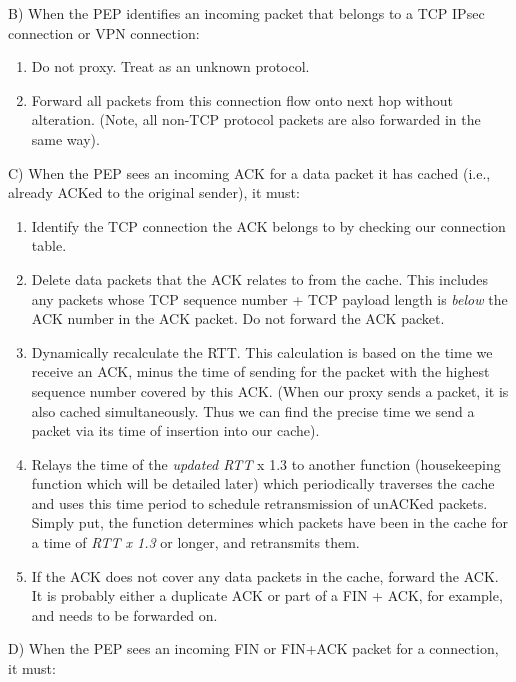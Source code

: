 \documentclass{uathesis}
\begin{document}
\noindent B) When the PEP identifies an incoming packet that belongs to a TCP IPsec connection or VPN connection:\\

\begin{enumerate}
\item Do not proxy. Treat as an unknown protocol.
\item Forward all packets from this connection flow onto next hop without alteration. (Note, all non-TCP protocol packets are also forwarded in the same way).\\
\end{enumerate}

\noindent C) When the PEP sees an incoming ACK for a data packet it has cached (i.e., already ACKed to the original sender), it must:\\

\begin{enumerate}
\item Identify the TCP connection the ACK belongs to by checking our connection table. 
\item Delete data packets that the ACK relates to from the cache. This includes any packets whose TCP sequence number + TCP payload length is \emph{below} the ACK number in the ACK packet. Do not forward the ACK packet.
\item Dynamically recalculate the RTT. This calculation is based on the time we receive an ACK, minus the time of sending for the packet with the highest sequence number covered by this ACK. (When our proxy sends a packet, it is also cached simultaneously. Thus we can find the precise time we send a packet via its time of insertion into our cache).
\item Relays the time of the \emph{updated RTT} x 1.3 to another function (housekeeping function which will be detailed later) which periodically traverses the cache and uses this time period to schedule retransmission of unACKed packets. Simply put, the function determines which packets have been in the cache for a time of \emph{RTT x 1.3} or longer, and retransmits them.

\item If the ACK does not cover any data packets in the cache, forward the ACK. It is probably either a duplicate ACK or part of a FIN + ACK, for example, and needs to be forwarded on.\\
\end{enumerate}

\noindent D) When the PEP sees an incoming FIN or FIN+ACK packet for a connection, it must:\\
\end{document}
